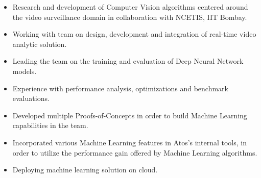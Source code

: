 \documentclass[10pt,a4paper,ragged2e]{altacv}
\begin{document}

\begin{fullwidth}
\makecvheader
\end{fullwidth}



\begin{itemize}
\item Research and development of Computer Vision algorithms centered around the video surveillance domain in collaboration with NCETIS, IIT Bombay.
\smallskip
\item Working with team on design, development and integration of real-time video analytic solution.
\smallskip
\item Leading the team on the training and evaluation of Deep Neural Network models.
\smallskip
\item Experience with performance analysis, optimizations and benchmark evaluations.
\end{itemize}

\divider

\begin{itemize}
\item Developed multiple Proofs-of-Concepts in order to build Machine Learning capabilities in the team.
\smallskip
\item Incorporated various Machine Learning features in Atos's internal tools, in order to utilize the performance gain offered by Machine Learning algorithms.
\item Deploying machine learning solution on cloud.
\end{itemize}
\end{document}
